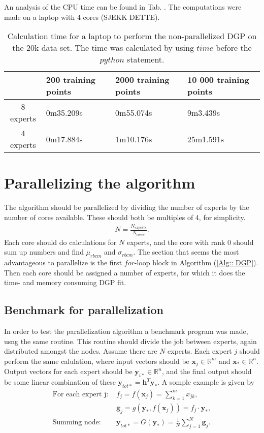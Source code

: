 \documentclass[twoside,english]{uiofysmaster}
\begin{document}
An analysis of the CPU time can be found in Tab. . The computations were made on a laptop with 4 cores (SJEKK DETTE).

\begin{table}
\centering
\begin{tabular}{|c|l|l|l|}
\hline
 & 200 training points & 2000 training points & 10 000 training points\\
 \hline
8 experts & 0m35.209s & 0m55.074s & 9m3.439s\\
4 experts & 0m17.884s & 1m10.176s & 25m1.591s\\
\hline
\end{tabular}
\caption{Calculation time for a laptop to perform the non-parallelized DGP on the 20k data set. The time was calculated by using $time$ before the $python$ statement.}
\end{table}
 
\section{Parallelizing the algorithm} 
 
 
The algorithm should be parallelized by dividing the number of experts by the number of cores available. These should both be multiples of 4, for simplicity.
\begin{align}
N = \frac{N_{experts}}{N_{cores}}.
\end{align} 
Each core should do calculations for $N$ experts, and the core with rank 0 should sum up numbers and find $\mu_{rbcm}$ and $\sigma_{rbcm}$. The section that seems the most advantageous to parallelize is the first $for$-loop block in Algorithm (\ref{Alg:: DGP}). Then each core should be assigned a number of experts, for which it does the time- and memory consuming DGP fit.

\subsection{Benchmark for parallelization}

In order to test the parallelization algorithm a benchmark program was made, usng the same routine. This routine should divide the job between experts, again distributed amongst the nodes. Assume there are $N$ experts. Each expert $j$ should perform the same calulation, where input vectors should be $\textbf{x}_j \in \mathbb{R}^m$ and $\textbf{x}_* \in \mathbb{R}^{n}$. Output vectors for each expert should be $\textbf{y}_{i*} \in \mathbb{R}^n$, and the final output should be some linear combination of these $\textbf{y}_{tot *} = \textbf{h}^T \textbf{y}_*$. A somple example is given by
\begin{align}
\text{For each expert j: } & f_j = f(\textbf{x}_j) = \sum_{k=1}^m x_{j k},\\
& \textbf{g}_j = g (\textbf{y}_*, f(\textbf{x}_j)) = f_j \cdot \textbf{y}_*,\\
\text{Summing node: } & \textbf{y}_{tot *} = G(\textbf{y}_*) = \frac{1}{N} \sum_{j=1}^N \textbf{g}_j.
\end{align}
\end{document}
